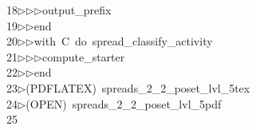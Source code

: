 \begin{tabbing}
18\>$\triangleright$\>$\triangleright$\>$\triangleright$\>output\_prefix\ \ \\[0pt]
19\>$\triangleright$\>$\triangleright$\>end\ \\[0pt]
20\>$\triangleright$\>$\triangleright$\>with\ C\ do\ spread\_classify\_activity\ \\[0pt]
21\>$\triangleright$\>$\triangleright$\>$\triangleright$\>compute\_starter\ \\[0pt]
22\>$\triangleright$\>$\triangleright$\>end\\[0pt]
23\>$\triangleright$\>(PDFLATEX)\ spreads\_2\_2\_poset\_lvl\_5tex\\[0pt]
24\>$\triangleright$\>(OPEN)\ spreads\_2\_2\_poset\_lvl\_5pdf\\[0pt]
25\>\end{tabbing}
